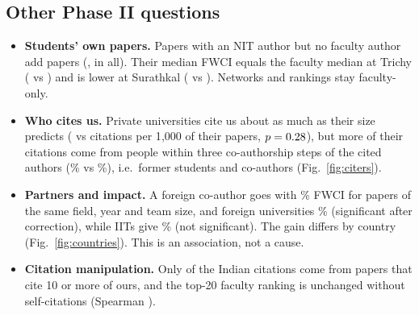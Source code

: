 \documentclass[10pt,twocolumn,a4paper]{article}
\begin{document}
\subsection{Other Phase II questions}
\begin{itemize}
\item \textbf{Students' own papers.} Papers with an NIT author but no faculty author add \stuN{} papers (\stuPct, \stuAll{} in all). Their median FWCI
equals the faculty median at Trichy (\stuMedT{} vs \facMedT) and is lower at Surathkal (\stuMedS{} vs \facMedS). Networks and rankings stay faculty-only.
\item \textbf{Who cites us.} Private universities cite us about as much as their size predicts (\privPer{} vs \pubPer{} citations per 1{,}000 of their
papers, $p=0.28$), but more of their citations come from people within three co-authorship steps of the cited authors (\privNear\% vs \pubNear\%),
i.e.\ former students and co-authors (Fig.~\ref{fig:citers}).
\item \textbf{Partners and impact.} A foreign co-author goes with \forEff\% FWCI for papers of the same field, year and team size, and foreign
universities \forUni\% (significant after correction), while IITs give \iitEff\% (not significant). The gain differs by country (Fig.~\ref{fig:countries}). This is an association, not a cause.
\item \textbf{Citation manipulation.} Only \manipShare{} of the \manipN{} Indian citations come from papers that cite 10 or more of ours, and the top-20
faculty ranking is unchanged without self-citations (Spearman \manipRho).
\end{itemize}
\end{document}

